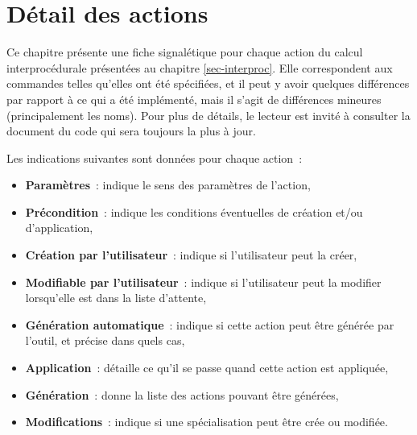 
\chapter{Détail des actions} \label{app-actions}

Ce chapitre présente une fiche signalétique pour chaque action du calcul
interprocédurale présentées au chapitre \ref{sec-interproc}.
Elle correspondent aux commandes telles qu'elles ont été spécifiées,
et il peut y avoir quelques différences par rapport à ce qui a été implémenté,
mais il s'agit de différences mineures (principalement les noms).
Pour plus de détails, le lecteur est invité à consulter la document du code
qui sera toujours la plus à jour.\\

\newcommand{\proto}[2]{
  \section{#1}\labact{#1}{2}
  \centerline{\textit{#1}(#2)}
  \bb
  }
\newcommand{\precond}{{\bf Précondition}}
\newcommand{\param}{{\bf Paramètres}}
\newcommand{\creable}{{\bf Création par l'utilisateur}}
\newcommand{\modifiable}{{\bf Modifiable par l'utilisateur}}
\newcommand{\generable}{{\bf Génération automatique}}
\newcommand{\application}{{\bf Application}}
\newcommand{\genere}{{\bf Génération}}
\newcommand{\modifie}{{\bf Modifications}}

Les indications suivantes sont données pour chaque action~:
\begin{itemize}
  \item \param~: indique le sens des paramètres de l'action,
  \item \precond~: indique les conditions éventuelles de création et/ou
    d'application,
  \item \creable~: indique si l'utilisateur peut la créer,
  \item \modifiable~: indique si l'utilisateur peut la modifier lorsqu'elle est
    dans la liste d'attente,
  \item \generable~: indique si cette action peut être générée par l'outil,
    et précise dans quels cas,
  \item \application~: détaille ce qu'il se passe quand cette action est
    appliquée,
  \item \genere~: donne la liste des actions pouvant être générées,
  \item \modifie~: indique si une spécialisation peut être crée ou modifiée.
\end{itemize}


